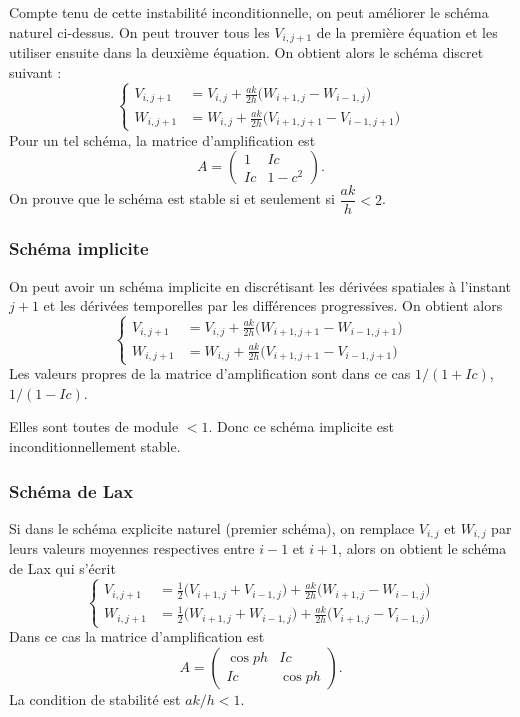 Compte tenu de cette instabilité inconditionnelle, on peut améliorer le schéma
naturel ci-dessus. On peut trouver tous les $V_{i,j+1}$ de la première
équation et les utiliser ensuite dans la deuxième équation. On obtient alors le
schéma discret suivant :
\[
  \left\{
  \begin{aligned}
    V_{i,j+1} &= V_{i,j} + \frac{ak}{2h}\bigl(W_{i+1,j} - W_{i-1,j}\bigr)\\[0.3em]
    W_{i,j+1} &= W_{i,j} + \frac{ak}{2h}\bigl(V_{i+1,j+1} - V_{i-1,j+1}\bigr)
  \end{aligned}
  \right.
\]
Pour un tel schéma, la matrice d'amplification est
\[
  A = \begin{pmatrix} 1 & Ic\\ Ic & 1 - c^2 \end{pmatrix}.
\]
On prouve que le schéma est stable si et seulement si $\dfrac{ak}{h} < 2$.

\subsubsection{Schéma implicite}

On peut avoir un schéma implicite en discrétisant les dérivées spatiales à
l'instant $j+1$ et les dérivées temporelles par les différences progressives.
On obtient alors
\[
  \left\{
  \begin{aligned}
    V_{i,j+1} &= V_{i,j} + \frac{ak}{2h}\bigl(W_{i+1,j+1} - W_{i-1,j+1}\bigr)\\[0.3em]
    W_{i,j+1} &= W_{i,j} + \frac{ak}{2h}\bigl(V_{i+1,j+1} - V_{i-1,j+1}\bigr)
  \end{aligned}
  \right.
\]
Les valeurs propres de la matrice d'amplification sont dans ce cas
$1/(1 + Ic)$, $1/(1 - Ic)$.

Elles sont toutes de module $< 1$. Donc ce schéma implicite est
inconditionnellement stable.

\subsubsection{Schéma de Lax}

Si dans le schéma explicite naturel (premier schéma), on remplace $V_{i,j}$ et
$W_{i,j}$ par leurs valeurs moyennes respectives entre $i-1$ et $i+1$, alors
on obtient le schéma de Lax qui s'écrit
\[
  \left\{
  \begin{aligned}
    V_{i,j+1} &= \frac{1}{2}\bigl(V_{i+1,j} + V_{i-1,j}\bigr)
               + \frac{ak}{2h}\bigl(W_{i+1,j} - W_{i-1,j}\bigr)\\[0.3em]
    W_{i,j+1} &= \frac{1}{2}\bigl(W_{i+1,j} + W_{i-1,j}\bigr)
               + \frac{ak}{2h}\bigl(V_{i+1,j} - V_{i-1,j}\bigr)
  \end{aligned}
  \right.
\]
Dans ce cas la matrice d'amplification est
\[
  A = \begin{pmatrix} \cos ph & Ic\\ Ic & \cos ph \end{pmatrix}.
\]
La condition de stabilité est $ak/h < 1$.


